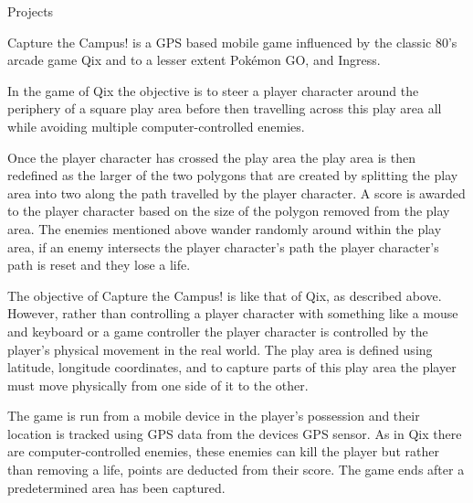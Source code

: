 \documentclass{cv}
\begin{document}
\begin{rSection}{Projects}
\item Capture the Campus! is a GPS based mobile game influenced by the classic 80’s arcade game Qix and to a lesser extent Pokémon GO, and Ingress.

\item In the game of Qix the objective is to steer a player character around the periphery of a square play area before then travelling across this play area all while avoiding multiple computer-controlled enemies.

\item Once the player character has crossed the play area the play area is then redefined as the larger of the two polygons that are created by splitting the play area into two along the path travelled by the player character. A score is awarded to the player character based on the size of the polygon removed from the play area. The enemies mentioned above wander randomly around within the play area, if an enemy intersects the player character’s path the player character’s path is reset and they lose a life.

\item The objective of Capture the Campus! is like that of Qix, as described above. However, rather than controlling a player character with something like a mouse and keyboard or a game controller the player character is controlled by the player’s physical movement in the real world.
The play area is defined using latitude, longitude coordinates, and to capture parts of this play area the player must move physically from one side of it to the other.

\item The game is run from a mobile device in the player’s possession and their location is tracked using GPS data from the devices GPS sensor.
As in Qix there are computer-controlled enemies, these enemies can kill the player but rather than removing a life, points are deducted from their score.
The game ends after a predetermined area has been captured.

\end{rSection}

\end{document}
